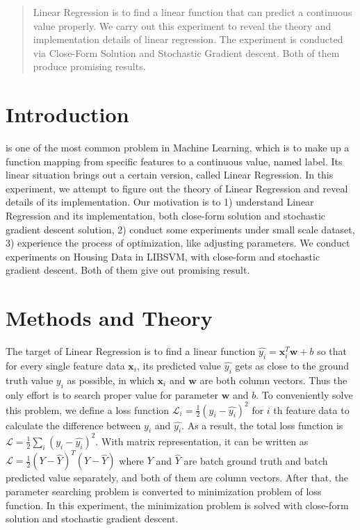 \documentclass[journal, a4paper]{IEEEtran}
\begin{document}
\begin{abstract}
Linear Regression is to find a linear function that can predict a continuous value properly. We carry out this experiment to reveal the theory and implementation details of linear regression. The experiment is conducted via Close-Form Solution and Stochastic Gradient descent. Both of them produce promising results.
\end{abstract}

\section{Introduction}
 is one of the most common problem in Machine Learning, which is to make up a function mapping from specific features to a continuous value, named label. Its linear situation brings out a certain version, called Linear Regression. In this experiment, we attempt to figure out the theory of Linear Regression and reveal details of its implementation. Our motivation is to 1) understand Linear Regression and its implementation, both close-form solution and stochastic gradient descent solution, 2) conduct some experiments under small scale dataset, 3) experience the process of optimization, like adjusting parameters. We conduct experiments on Housing Data in LIBSVM, with close-form and stochastic gradient descent. Both of them give out promising result.

\section{Methods and Theory}
The target of Linear Regression is to find a linear function $\hat{y_i}=\bm{x}_i^T\bm{w}+b$ so that for every single feature data $\bm{x}_i$, its predicted value $\hat{y_i}$ gets as close to the ground truth value $y_i$ as possible, in which $\bm{x}_i$ and $\bm{w}$ are both column vectors. Thus the only effort is to search proper value for parameter $\bm{w}$ and $b$. To conveniently solve this problem, we define a loss function $\mathcal{L}_i=\frac{1}{2}(y_i-\hat{y_i})^2$ for $i$ th feature data to calculate the difference between $y_i$ and $\hat{y_i}$. As a result, the total loss function is $\mathcal{L}=\frac{1}{2}\sum_i{(y_i-\hat{y_i})^2}$. With matrix representation, it can be written as $\mathcal{L}=\frac{1}{2}(Y-\hat{Y})^T(Y-\hat{Y})$ where $Y$ and $\hat{Y}$ are batch ground truth and batch predicted value separately, and both of them are column vectors. After that, the parameter searching problem is converted to minimization problem of loss function. In this experiment, the minimization problem is solved with close-form solution and stochastic gradient descent.
\end{document}
